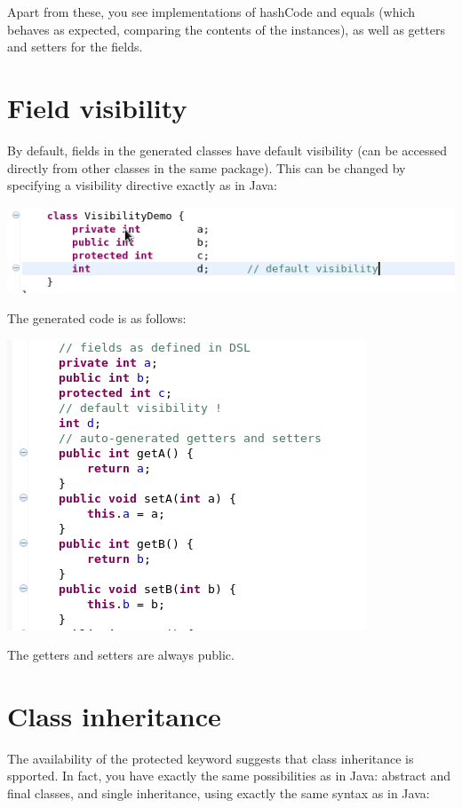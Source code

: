 \documentclass[11pt,a4paper,oneside]{article}
\begin{document}
Apart from these, you see implementations of {\ttfamily hashCode} and {\ttfamily equals} (which behaves as expected, comparing the contents of
the instances), as well as getters and setters for the fields.

\section{Field visibility}
By default, fields in the generated classes have default visibility (can be accessed directly from other classes in the same package). This can be changed by
specifying a visibility directive exactly as in Java:

\vspace{2mm}
\hspace{1cm}\includegraphics[scale=0.5]{images/tut1-006.png}
 
\noindent The generated code is as follows:

\vspace{2mm}
\hspace{1cm}\includegraphics[scale=0.5]{images/tut1-008.png}
 
\noindent The getters and setters are always public.

\section{Class inheritance}
The availability of the {\ttfamily protected} keyword suggests that class inheritance is spported. In fact, you have exactly the same
possibilities as in Java: abstract and final classes, and single inheritance, using exactly the same syntax as in Java:
 
\end{document}
